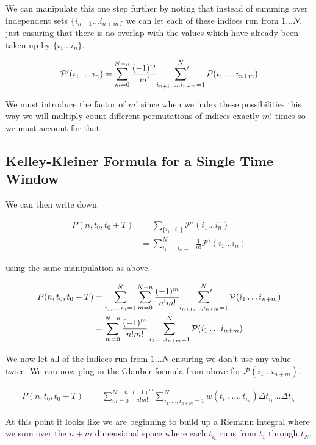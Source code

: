 \documentclass[12pt]{article}
\begin{document}
We can manipulate this one step further by noting that instead of summing over independent sets $\{i_{n+1} \ldots i_{n+m}\}$ we can let each of these indices run from $1 \ldots N$, just ensuring that there is no overlap with the values which have already been taken up by $\{i_1 \ldots i_n\}$.

\begin{align}
\mathcal{P}'(i_1 \ldots i_n) = \sum_{m=0}^{N-n} \frac{(-1)^m}{m!} \sideset{}{'}\sum_{i_{n+1}, \ldots ,i_{n+m} = 1}^N \mathcal{P}(i_1 \ldots i_{n+m})
\end{align}

We must introduce the factor of $m!$ since when we index these possibilities this way we will multiply count different permutations of indices exactly $m!$ times so we must account for that.

\subsection{Kelley-Kleiner Formula for a Single Time Window}

We can then write down

\begin{align}
P(n,t_0,t_0+T) &= \sum_{\{i_1 \ldots i_n\}} \mathcal{P}'(i_1 \ldots i_n)\\
&= \sum_{i_1, \ldots, i_n = 1}^N \frac{1}{n!} \mathcal{P}'(i_1 \ldots i_n)
\end{align}

using the same manipulation as above.

\begin{align}
P(n,t_0,t_0+T) &=\sum_{i_1, \ldots ,i_n=1}^N \sum_{m=0}^{N-n} \frac{(-1)^m}{n!m!} \sideset{}{'}\sum_{i_{n+1}, \ldots ,i_{n+m}=1}^N \mathcal{P}(i_1 \ldots i_{n+m})\\
&= \sum_{m=0}^{N-n} \frac{(-1)^m}{n! m!} \sum_{i_1, \ldots ,i_{n+m}=1}^N \mathcal{P}(i_1 \ldots i_{n+m})
\end{align}

We now let all of the indices run from $1 \ldots N$ ensuring we don't use any value twice. We can now plug in the Glauber formula from above for $\mathcal{P}(i_1 \ldots i_{n+m})$.

\begin{align}
P(n,t_0,t_0+T) &= \sum_{m=0}^{N-n} \frac{(-1)^m}{n! m!} \sum_{i_1, \ldots ,i_{n+m}=1}^N w(t_{i_1},\ldots ,t_{i_{n}}) \Delta t_{i_1} \ldots \Delta t_{i_n}
\end{align}

At this point it looks like we are beginning to build up a Riemann integral where we sum over the $n+m$ dimensional space where each $t_{i_k}$ runs from $t_1$ through $t_N$.
\end{document}
